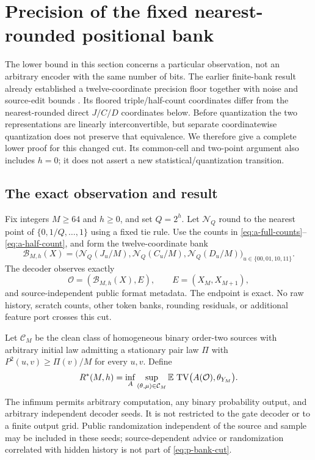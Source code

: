 \section{Precision of the fixed nearest-rounded positional bank}
\label{sec:precision-proofs}

The lower bound in this section concerns a particular observation, not
an arbitrary encoder with the same number of bits.  The earlier
finite-bank result already established a twelve-coordinate precision
floor together with noise and source-edit bounds \citep{BCJ001}.  Its floored
triple/half-count coordinates differ from the nearest-rounded direct
$J/C/D$ coordinates below.  Before quantization the two representations
are linearly interconvertible, but separate coordinatewise quantization
does not preserve that equivalence.  We therefore give a complete
lower proof for this changed cut.  Its common-cell and two-point
argument also includes $h=0$; it does not assert a new
statistical/quantization transition.

\subsection{The exact observation and result}

Fix integers $M\ge64$ and $h\ge0$, and set $Q=2^h$.
Let $\mathcal N_Q$ round to the nearest point of
$\{0,1/Q,\ldots,1\}$ using a fixed tie rule.
Use the counts in \eqref{eq:a-full-counts}--\eqref{eq:a-half-count},
and form the twelve-coordinate bank
\begin{equation}\label{eq:p-bank}
 \mathcal B_{M,h}(X)=
 \bigl(\mathcal N_Q(J_u/M),\mathcal N_Q(C_u/M),
       \mathcal N_Q(D_u/M)\bigr)_{u\in\{00,01,10,11\}}.
\end{equation}
The decoder observes exactly
\begin{equation}\label{eq:p-bank-cut}
 \mathcal O=(\mathcal B_{M,h}(X),E),\qquad
 E=(X_M,X_{M+1}),
\end{equation}
and source-independent public format metadata.  The endpoint is exact.
No raw history, scratch counts, other token banks, rounding residuals,
or additional feature port crosses this cut.

Let $\mathcal C_M$ be the clean class of homogeneous binary order-two
sources with arbitrary initial law admitting a stationary pair law
$\Pi$ with $P^2(u,v)\ge\Pi(v)/M$ for every $u,v$.  Define
\begin{equation}\label{eq:p-bank-minimax}
 R^*(M,h)=\inf_A\sup_{(\theta,\mu)\in\mathcal C_M}
 \mathbb E\,\operatorname{TV}\bigl(A(\mathcal O),\theta_{Y_M}\bigr).
\end{equation}
The infimum permits arbitrary computation, any binary probability
output, and arbitrary independent decoder seeds.  It is not restricted
to the gate decoder or to a finite output grid.  Public randomization
independent of the source and sample may be included in these seeds;
source-dependent advice or randomization correlated with hidden history
is not part of \eqref{eq:p-bank-cut}.

